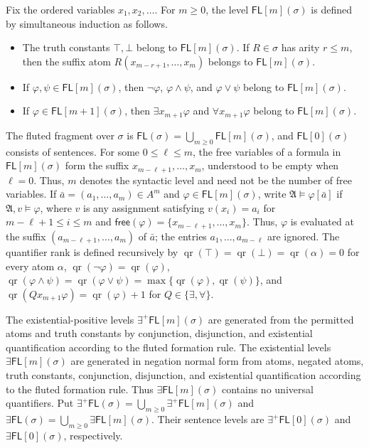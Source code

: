 \documentclass{lmcs}
\newcommand{\FL}{\mathsf{FL}}
\newcommand{\EPFL}{\exists^{+}\!\mathsf{FL}}
\newcommand{\EFL}{\exists\mathsf{FL}}
\newcommand{\qr}{\operatorname{qr}}
\newcommand{\true}{\top}
\newcommand{\false}{\bot}
\newcommand{\A}{\mathfrak{A}}
\begin{document}
Fix the ordered variables $x_1,x_2,\ldots$.  For $m\geq0$, the level
$\FL[m](\sigma)$ is defined by simultaneous induction as follows.
\begin{itemize}
  \item The truth constants $\true,\false$ belong to $\FL[m](\sigma)$.
  If $R\in\sigma$ has arity $r\leq m$, then the suffix atom
  $R(x_{m-r+1},\ldots,x_m)$ belongs to $\FL[m](\sigma)$.
  \item If $\varphi,\psi\in\FL[m](\sigma)$, then
  $\neg\varphi$, $\varphi\wedge\psi$, and $\varphi\vee\psi$ belong to
  $\FL[m](\sigma)$.
  \item If $\varphi\in\FL[m+1](\sigma)$, then
  $\exists x_{m+1}\varphi$ and $\forall x_{m+1}\varphi$ belong to
  $\FL[m](\sigma)$.
\end{itemize}
The fluted fragment over $\sigma$ is
$\FL(\sigma)=\bigcup_{m\geq0}\FL[m](\sigma)$, and $\FL[0](\sigma)$ consists
of sentences.  For some $0\leq\ell\leq m$, the free variables of a formula in
$\FL[m](\sigma)$ form the suffix $x_{m-\ell+1},\ldots,x_m$, understood to be
empty when $\ell=0$.  Thus, $m$ denotes the syntactic level and need not be the
number of free variables.  If
$\bar a=(a_1,\ldots,a_m)\in A^m$ and $\varphi\in\FL[m](\sigma)$, write
$\A\models\varphi[\bar a]$ if $\A,v\models\varphi$, where $v$ is any
assignment satisfying $v(x_i)=a_i$ for $m-\ell+1\leq i\leq m$ and
$\mathsf{free}(\varphi)=\{x_{m-\ell+1},\ldots,x_m\}$.  Thus, $\varphi$ is
evaluated at the suffix $(a_{m-\ell+1},\ldots,a_m)$ of $\bar a$; the entries
$a_1,\ldots,a_{m-\ell}$ are ignored.  The quantifier rank is defined recursively
by $\qr(\true)=\qr(\false)=\qr(\alpha)=0$ for every atom $\alpha$,
$\qr(\neg\varphi)=\qr(\varphi)$,
$\qr(\varphi\wedge\psi)=\qr(\varphi\vee\psi)
=\max\{\qr(\varphi),\qr(\psi)\}$, and
$\qr(Qx_{m+1}\varphi)=\qr(\varphi)+1$ for $Q\in\{\exists,\forall\}$.

The existential-positive levels $\EPFL[m](\sigma)$ are generated from the
permitted atoms and truth constants by conjunction, disjunction, and
existential quantification according to the fluted formation rule.  The
existential levels $\EFL[m](\sigma)$ are
generated in negation normal form from atoms, negated atoms, truth constants,
conjunction, disjunction, and existential quantification according to the
fluted formation rule.  Thus
$\EFL[m](\sigma)$ contains no universal quantifiers.  Put
$\EPFL(\sigma)=\bigcup_{m\geq0}\EPFL[m](\sigma)$ and
$\EFL(\sigma)=\bigcup_{m\geq0}\EFL[m](\sigma)$.  Their sentence levels are
$\EPFL[0](\sigma)$ and $\EFL[0](\sigma)$, respectively.
\end{document}
